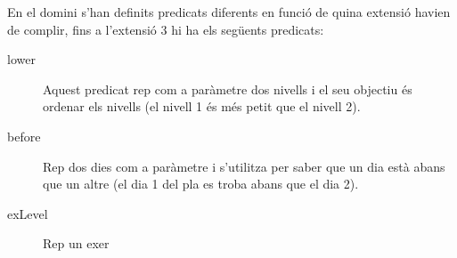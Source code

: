 \documentclass[a4paper,12pt, UTF-8]{article}
\begin{document}
En el domini s'han definits predicats diferents en funció de quina extensió havien de complir, fins a l'extensió 3 hi ha els següents predicats:

\begin{description}
	\item[lower] Aquest predicat rep com a paràmetre dos nivells i el seu objectiu és ordenar els nivells (el nivell 1 és més petit que el nivell 2).
	\item[before] Rep dos dies com a paràmetre i s'utilitza per saber que un dia està abans que un altre (el dia 1 del pla es troba abans que el dia 2).
	\item[exLevel] Rep un exer
\end{description}
\end{document}
